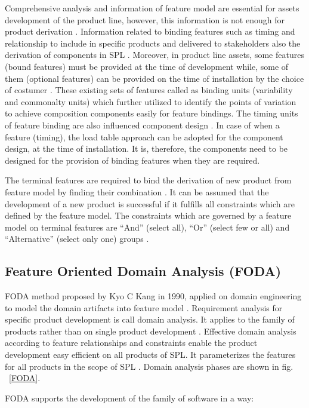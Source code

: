 Comprehensive analysis and information of feature model are essential for assets development of the product line, however, this information is not enough for product derivation \cite{t72}. Information related to binding features such as timing and relationship to include in specific products and delivered to stakeholders also the derivation of components in SPL \cite{t73}. Moreover, in product line assets, some features (bound features) must be provided at the time of development while, some of them (optional features) can be provided on the time of installation by the choice of costumer \cite{t74, t75}. These existing sets of features called as binding units (variability and commonalty units) which further utilized to identify the points of variation to achieve composition components easily for feature bindings. The timing units of feature binding are also influenced component design \cite{t76}. In case of when a feature (timing), the load table approach can be adopted for the component design, at the time of installation. It is, therefore, the components need to be designed for the provision of binding features when they are required.

The terminal features are required to bind the derivation of new product from feature model by finding their combination \cite{t77}. It can be assumed that the development of a new product is successful if it fulfills all constraints which are defined by the feature model. The constraints which are governed by a feature model on terminal features are “And” (select all), “Or” (select few or all) and “Alternative” (select only one) groups \cite{t78, t79}.

\subsection{Feature Oriented Domain Analysis (FODA)}

FODA method proposed by Kyo C Kang in 1990, applied on domain engineering to model the domain artifacts into feature model \cite{t80}. Requirement analysis for specific product development is call domain analysis. It applies to the family of products rather than on single product development \cite{t81}. Effective domain analysis according to feature relationships and constraints enable the product development easy efficient on all products of SPL. It parameterizes the features for all products in the scope of SPL \cite{t82, tr83}.
Domain analysis phases are shown in fig. ~\ref{FODA}.

FODA supports the development of the family of software in a way:

